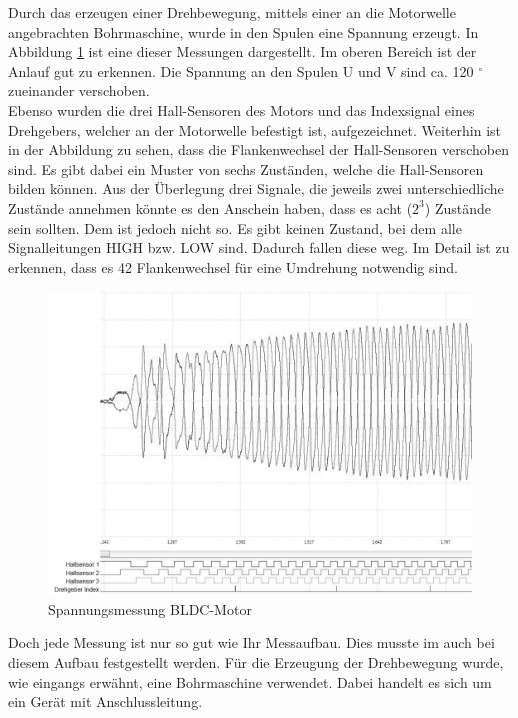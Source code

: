 Durch das erzeugen einer Drehbewegung, mittels einer an die Motorwelle angebrachten Bohrmaschine, wurde in den Spulen eine Spannung erzeugt.
In Abbildung \ref{fig:Spannungsmessung_BLDC_Motor} ist eine dieser Messungen dargestellt.
Im oberen Bereich ist der Anlauf gut zu erkennen.
Die Spannung an den Spulen U und V sind ca. 120 $^\circ$ zueinander verschoben.\\


Ebenso wurden die drei Hall-Sensoren des Motors und das Indexsignal eines Drehgebers, welcher an der Motorwelle befestigt ist, aufgezeichnet.
Weiterhin ist in der Abbildung zu sehen, dass die Flankenwechsel der Hall-Sensoren verschoben sind.
Es gibt dabei ein Muster von sechs Zuständen, welche die Hall-Sensoren bilden können.
Aus der Überlegung drei Signale, die jeweils zwei unterschiedliche Zustände annehmen könnte es den Anschein haben, dass es acht ($2^3$) Zustände sein sollten.
Dem ist jedoch nicht so. 
Es gibt keinen Zustand, bei dem alle Signalleitungen HIGH bzw. LOW sind. Dadurch fallen diese weg.
Im Detail ist zu erkennen, dass es 42 Flankenwechsel für eine Umdrehung notwendig sind.

\begin{figure}[htbp]
	\centering
	\includegraphics[width=\textwidth-2cm]{tests/graphics/Spannungssignal_Messung}
	\caption{Spannungsmessung BLDC-Motor}
	\label{fig:Spannungsmessung_BLDC_Motor}
\end{figure}


Doch jede Messung ist nur so gut wie Ihr Messaufbau.
Dies musste im auch bei diesem Aufbau festgestellt werden.
Für die Erzeugung der Drehbewegung wurde, wie eingangs erwähnt, eine Bohrmaschine verwendet.
Dabei handelt es sich um ein Gerät mit Anschlussleitung.\\


